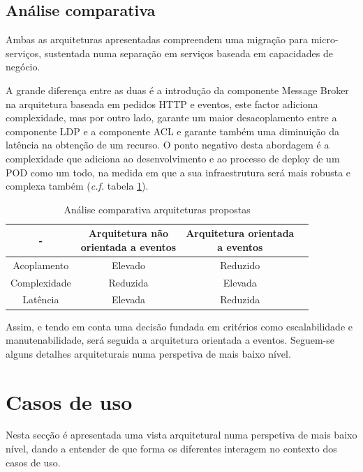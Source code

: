 \subsection{Análise comparativa \label{conclusão_arquitetura}}
Ambas as arquiteturas apresentadas compreendem uma migração para micro-serviços, sustentada numa separação em serviços baseada em capacidades de negócio.

A grande diferença entre as duas é a introdução da componente Message Broker na arquitetura baseada em pedidos HTTP e eventos, este factor adiciona complexidade, mas por outro lado, garante um maior desacoplamento entre a componente LDP e a componente ACL e garante também uma diminuição da latência na obtenção de um recurso. O ponto negativo desta abordagem é a complexidade que adiciona ao desenvolvimento e ao processo de deploy de um POD como um todo, na medida em que a sua infraestrutura será mais robusta e complexa também (\emph{c.f.} tabela \ref{table_comparacao_arquiteturas}).

\begin{table}[h]
\centering
\caption{Análise comparativa arquiteturas propostas}
\vspace{0.5cm}
\label{table_comparacao_arquiteturas}
\begin{tabular}{c|c|c|c} 
- & \specialcell{Arquitetura não\\orientada a eventos}  &\specialcell{Arquitetura orientada\\a eventos} \\
\hline                          
Acoplamento & Elevado & Reduzido \\
Complexidade & Reduzida & Elevada \\
Latência & Elevada & Reduzida \\
\end{tabular}
\end{table}

Assim, e tendo em conta uma decisão fundada em critérios como escalabilidade e manutenabilidade, será seguida a arquitetura orientada a eventos. Seguem-se alguns detalhes arquiteturais numa perspetiva de mais baixo nível.

\section{Casos de uso}
Nesta secção é apresentada uma vista arquitetural numa perspetiva de mais baixo nível, dando a entender de que forma os diferentes interagem no contexto dos casos de uso.

